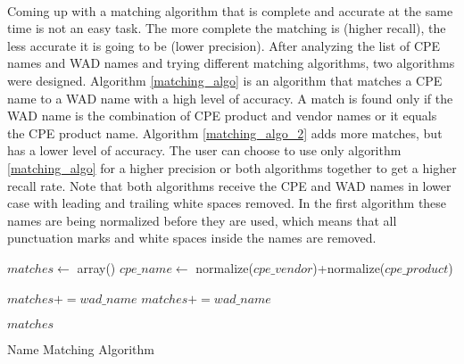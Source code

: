 \paragraph{}
Coming up with a matching algorithm that is complete and accurate at the same time is not an easy task. The more complete the matching is (higher recall), the less accurate it is going to be (lower precision). After analyzing the list of CPE names and WAD names and trying different matching algorithms, two algorithms were designed. Algorithm \ref{matching_algo} is an algorithm that matches a CPE name to a WAD name with a high level of accuracy. A match is found only if the WAD name is the combination of CPE product and vendor names or it equals the CPE product name. Algorithm \ref{matching_algo_2} adds more matches, but has a lower level of accuracy. The user can choose to use only algorithm \ref{matching_algo} for a higher precision or both algorithms together to get a higher recall rate. Note that both algorithms receive the CPE and WAD names in lower case with leading and trailing white spaces removed. In the first algorithm these names are being normalized before they are used, which means that all punctuation marks and white spaces inside the names are removed.  
\begin{algorithm}
\begin{algorithmic}
\STATE $matches\gets$ array()
\STATE $cpe\_name\gets$ normalize($cpe\_vendor$)+normalize($cpe\_product$)


		\STATE $matches+=wad\_name$
		\STATE $matches+=wad\_name$
		
		\ENDIF
\ENDFOR
\RETURN $matches$
%
%
%

\end{algorithmic}
\caption{Name Matching Algorithm}
\label{matching_algo}
\end{algorithm}

